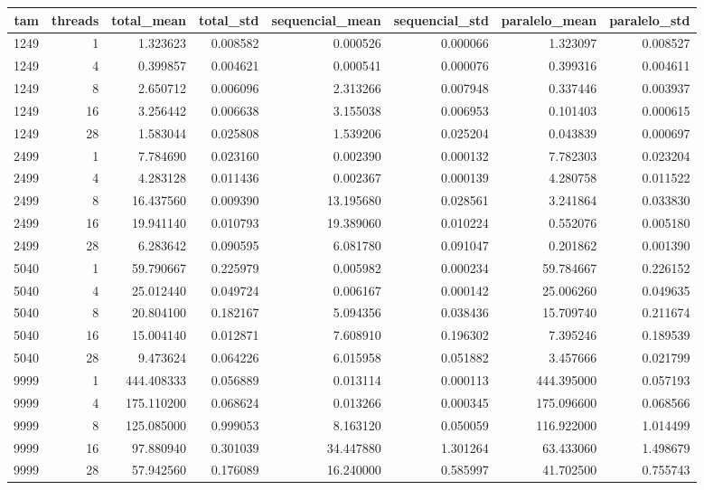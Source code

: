 \begin{tabular}{rrrrrrrr}
\toprule
tam & threads & total_mean & total_std & sequencial_mean & sequencial_std & paralelo_mean & paralelo_std \\
\midrule
1249 & 1 & 1.323623 & 0.008582 & 0.000526 & 0.000066 & 1.323097 & 0.008527 \\
1249 & 4 & 0.399857 & 0.004621 & 0.000541 & 0.000076 & 0.399316 & 0.004611 \\
1249 & 8 & 2.650712 & 0.006096 & 2.313266 & 0.007948 & 0.337446 & 0.003937 \\
1249 & 16 & 3.256442 & 0.006638 & 3.155038 & 0.006953 & 0.101403 & 0.000615 \\
1249 & 28 & 1.583044 & 0.025808 & 1.539206 & 0.025204 & 0.043839 & 0.000697 \\
2499 & 1 & 7.784690 & 0.023160 & 0.002390 & 0.000132 & 7.782303 & 0.023204 \\
2499 & 4 & 4.283128 & 0.011436 & 0.002367 & 0.000139 & 4.280758 & 0.011522 \\
2499 & 8 & 16.437560 & 0.009390 & 13.195680 & 0.028561 & 3.241864 & 0.033830 \\
2499 & 16 & 19.941140 & 0.010793 & 19.389060 & 0.010224 & 0.552076 & 0.005180 \\
2499 & 28 & 6.283642 & 0.090595 & 6.081780 & 0.091047 & 0.201862 & 0.001390 \\
5040 & 1 & 59.790667 & 0.225979 & 0.005982 & 0.000234 & 59.784667 & 0.226152 \\
5040 & 4 & 25.012440 & 0.049724 & 0.006167 & 0.000142 & 25.006260 & 0.049635 \\
5040 & 8 & 20.804100 & 0.182167 & 5.094356 & 0.038436 & 15.709740 & 0.211674 \\
5040 & 16 & 15.004140 & 0.012871 & 7.608910 & 0.196302 & 7.395246 & 0.189539 \\
5040 & 28 & 9.473624 & 0.064226 & 6.015958 & 0.051882 & 3.457666 & 0.021799 \\
9999 & 1 & 444.408333 & 0.056889 & 0.013114 & 0.000113 & 444.395000 & 0.057193 \\
9999 & 4 & 175.110200 & 0.068624 & 0.013266 & 0.000345 & 175.096600 & 0.068566 \\
9999 & 8 & 125.085000 & 0.999053 & 8.163120 & 0.050059 & 116.922000 & 1.014499 \\
9999 & 16 & 97.880940 & 0.301039 & 34.447880 & 1.301264 & 63.433060 & 1.498679 \\
9999 & 28 & 57.942560 & 0.176089 & 16.240000 & 0.585997 & 41.702500 & 0.755743 \\
\bottomrule
\end{tabular}

